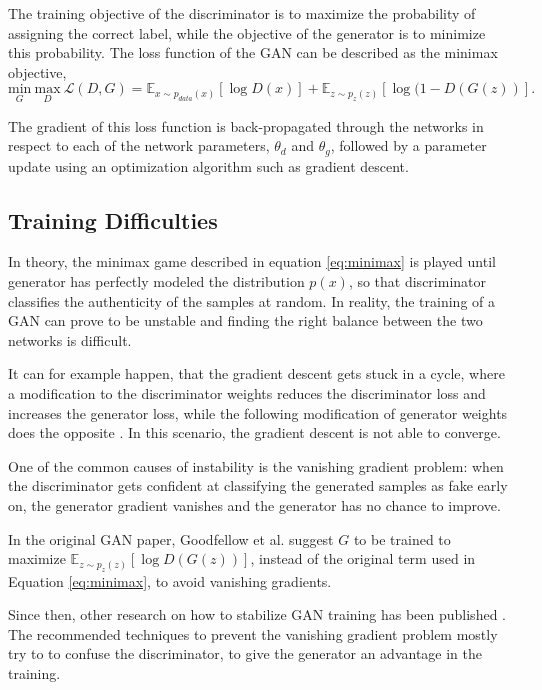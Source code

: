 \documentclass[12pt]{report}
\begin{document}
The training objective of the discriminator is to maximize the probability of assigning the correct label, while the objective of the generator is to minimize this probability. The loss function of the GAN can be described as the minimax objective,
\begin{equation}
\underset{G}{\mathrm{min}} \ \underset{D}{\mathrm{max}} \ \mathcal{L}(D,G) = \mathbb{E}_{x \sim p_{data}(x)}[\log D(x)] + \mathbb{E}_{z \sim p_{z}(z)}[\log (1 - D(G(z))].
\label{eq:minimax}
\end{equation}

The gradient of this loss function is back-propagated through the networks in respect to each of the network parameters, $\theta_{d}$ and $\theta_{g}$, followed by a parameter update using an optimization algorithm such as gradient descent.

\subsection{Training Difficulties} \label{sec:gan_diff}

In theory, the minimax game described in equation \ref{eq:minimax} is played until generator has perfectly modeled the distribution $p(x)$, so that discriminator classifies the authenticity of the samples at random. In reality, the training of a GAN can prove to be unstable and finding the right balance between the two networks is difficult.

It can for example happen, that the gradient descent gets stuck in a cycle, where a modification to the discriminator weights reduces the discriminator loss and increases the generator loss, while the following modification of generator weights does the opposite \cite{salimans_improved_2016}. In this scenario, the gradient descent is not able to converge.

One of the common causes of instability is the vanishing gradient problem: when the discriminator gets confident at classifying the generated samples as fake early on, the generator gradient vanishes and the generator has no chance to improve. 

In the original GAN paper, Goodfellow et al. \cite{goodfellow_generative_2014} suggest $G$ to be trained to maximize $\mathbb{E}_{z \sim p_{z}(z)}[\log D(G(z))]$, instead of the original term used in Equation \ref{eq:minimax}, to avoid vanishing gradients. 

Since then, other research on how to stabilize GAN training has been published \cite{arjovsky_towards_2017}\cite{roth_stabilizing_2017}\cite{salimans_improved_2016}. The recommended techniques to prevent the vanishing gradient problem mostly try to to confuse the discriminator, to give the generator an advantage in the training. 
\end{document}
